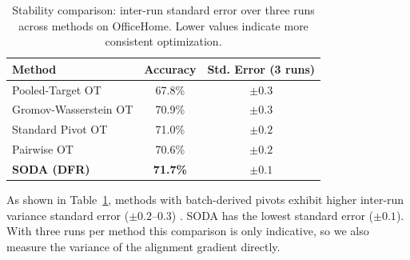 \documentclass[preprint,12pt]{elsarticle}
\providecommand{\DIFadd}[1]{{\protect\color{blue} \sf #1}} %
\providecommand{\DIFdel}[1]{{\protect\color{red} \scriptsize #1}} %
\providecommand{\DIFaddbegin}{} %
\providecommand{\DIFaddend}{} %
\providecommand{\DIFdelbegin}{} %
\providecommand{\DIFdelend}{} %
\providecommand{\DIFaddFL}[1]{\DIFadd{#1}} %
\providecommand{\DIFdelFL}[1]{\DIFdel{#1}} %
\providecommand{\DIFaddbeginFL}{} %
\providecommand{\DIFaddendFL}{} %
\providecommand{\DIFdelbeginFL}{} %
\providecommand{\DIFdelendFL}{} %
\newcommand{\DIFscaledelfig}{0.5}
\newlength{\DIFdelgraphicswidth} %
\newlength{\DIFdelgraphicsheight} %
\newcommand{\DIFaddincludegraphics}[2][]{{\color{blue}\fbox{\DIFOincludegraphics[#1]{#2}}}} %
\newcommand{\DIFdelincludegraphics}[2][]{%
\sbox{\DIFdelgraphicsbox}{\DIFOincludegraphics[#1]{#2}}%
\settoboxwidth{\DIFdelgraphicswidth}{\DIFdelgraphicsbox} %
\settoboxtotalheight{\DIFdelgraphicsheight}{\DIFdelgraphicsbox} %
\scalebox{\DIFscaledelfig}{%
\parbox[b]{\DIFdelgraphicswidth}{\usebox{\DIFdelgraphicsbox}\\[-\baselineskip] \rule{\DIFdelgraphicswidth}{0em}}\llap{\resizebox{\DIFdelgraphicswidth}{\DIFdelgraphicsheight}{%
\setlength{\unitlength}{\DIFdelgraphicswidth}%
\begin{picture}(1,1)%
\thicklines\linethickness{2pt} %
{\color[rgb]{1,0,0}\put(0,0){\framebox(1,1){}}}%
{\color[rgb]{1,0,0}\put(0,0){\line( 1,1){1}}}%
{\color[rgb]{1,0,0}\put(0,1){\line(1,-1){1}}}%
\end{picture}%
}\hspace*{3pt}}} %
} %
\DeclareRobustCommand{\DIFaddbegin}{\DIFOaddbegin \let\includegraphics\DIFaddincludegraphics} %
\DeclareRobustCommand{\DIFaddend}{\DIFOaddend \let\includegraphics\DIFOincludegraphics} %
\DeclareRobustCommand{\DIFdelbegin}{\DIFOdelbegin \let\includegraphics\DIFdelincludegraphics} %
\DeclareRobustCommand{\DIFdelend}{\DIFOaddend \let\includegraphics\DIFOincludegraphics} %
\DeclareRobustCommand{\DIFaddbeginFL}{\DIFOaddbeginFL \let\includegraphics\DIFaddincludegraphics} %
\DeclareRobustCommand{\DIFaddendFL}{\DIFOaddendFL \let\includegraphics\DIFOincludegraphics} %
\DeclareRobustCommand{\DIFdelbeginFL}{\DIFOdelbeginFL \let\includegraphics\DIFdelincludegraphics} %
\DeclareRobustCommand{\DIFdelendFL}{\DIFOaddendFL \let\includegraphics\DIFOincludegraphics} %
\begin{document}
\begin{table}[t]
\caption{Stability comparison: inter-run standard error \DIFaddbeginFL \DIFaddFL{over three runs }\DIFaddendFL across methods on OfficeHome.\DIFdelbeginFL \DIFdelFL{Lower values indicate more consistent optimization.}\DIFdelendFL }
\label{tab:stability_comparison}
\centering
\small
\DIFdelbeginFL %
\DIFdelendFL \DIFaddbeginFL \begin{tabular}{lcc}
\toprule
\textbf{Method} & \textbf{Accuracy} & \textbf{Std. Error (3 runs)} \\
\midrule
Pooled-Target OT & 67.8\% & $\pm 0.3$ \\
Gromov-Wasserstein OT & 70.9\% & $\pm 0.3$ \\
Standard Pivot OT & 71.0\% & $\pm 0.2$ \\
Pairwise OT & 70.6\% & $\pm 0.2$ \\
\textbf{SODA (DFR)} & \textbf{71.7\%} & $\pm 0.1$ \\
\bottomrule
\end{tabular}
\DIFaddendFL \end{table}

As shown in Table~\ref{tab:stability_comparison}, methods with batch-derived pivots exhibit higher inter-run \DIFdelbegin \DIFdel{variance }\DIFdelend \DIFaddbegin \DIFadd{standard error }\DIFaddend ($\pm 0.2$--$0.3$)\DIFaddbegin \DIFadd{. SODA has the lowest standard error ($\pm 0.1$). With three runs per method this comparison is only indicative, so we also measure the variance of the alignment gradient directly.
}
\end{document}
